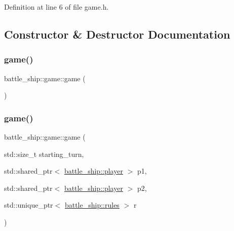 Definition at line 6 of file game.\+h.



\subsection{Constructor \& Destructor Documentation}
\mbox{\label{classbattle__ship_1_1game_a3a98cd01dec3c29d91d057049c421c89}} 
\subsubsection{\texorpdfstring{game()}{game()}\hspace{0.1cm}{\footnotesize\ttfamily [1/2]}}
{\footnotesize\ttfamily battle\+\_\+ship\+::game\+::game (\begin{DoxyParamCaption}{ }\end{DoxyParamCaption})\hspace{0.3cm}{\ttfamily [default]}}

\mbox{\label{classbattle__ship_1_1game_ab798a2291e0ef511be6d613cc48d26bb}} 
\subsubsection{\texorpdfstring{game()}{game()}\hspace{0.1cm}{\footnotesize\ttfamily [2/2]}}
{\footnotesize\ttfamily battle\+\_\+ship\+::game\+::game (\begin{DoxyParamCaption}\item[{std\+::size\+\_\+t}]{starting\+\_\+turn,  }\item[{std\+::shared\+\_\+ptr$<$ \hyperlink{classbattle__ship_1_1player}{battle\+\_\+ship\+::player} $>$}]{p1,  }\item[{std\+::shared\+\_\+ptr$<$ \hyperlink{classbattle__ship_1_1player}{battle\+\_\+ship\+::player} $>$}]{p2,  }\item[{std\+::unique\+\_\+ptr$<$ \hyperlink{classbattle__ship_1_1rules}{battle\+\_\+ship\+::rules} $>$}]{r }\end{DoxyParamCaption})\hspace{0.3cm}{\ttfamily [inline]}}



